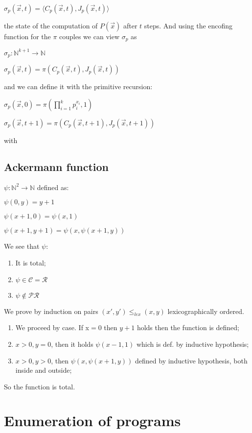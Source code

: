 \documentclass{amsbook}
\newcommand{\nat}{\ensuremath{\mathbb{N}}}
\theoremstyle{definition}
\theoremstyle{remark}
\numberwithin{section}{chapter}
\numberwithin{equation}{chapter}
\begin{document}
\begin{center}
    $\sigma_p(\vec{x},t) = \langle C_p(\vec{x},t), J_p(\vec{x},t) \rangle$
\end{center}

the state of the computation of $P(\vec{x})$ after $t$ steps. And using the encofing function for the $\pi$ couples we can view $\sigma_p$ as

$\sigma_p : \nat^{k+1} \rightarrow \nat$

$\sigma_p(\vec{x}, t) = \pi(C_p(\vec{x},t), J_p(\vec{x},t))$

and we can define it with the primitive recursion:

$\sigma_p(\vec{x}, 0) = \pi(\prod\limits_{i=1}^k p_i^{x_i}, 1)$

$\sigma_p(\vec{x}, t+1) = \pi(C_p(\vec{x},t+1), J_p(\vec{x},t+1))$

with

\section{Ackermann function}
$ \psi: \nat^2 \rightarrow \nat $ defined as:

$ \psi(0,y) = y+1 $

$ \psi(x+1,0) = \psi(x,1) $

$ \psi(x+1,y+1) = \psi(x, \psi(x+1, y)) $

We see that $ \psi $:
\begin{enumerate}
	\item It is total;
	\item $ \psi \in \mathcal{C} = \mathcal{R} $
	\item $ \psi \not \in \mathcal{PR} $
\end{enumerate}

We prove by induction on pairs $ (x',y') \leq_{lex} (x,y) $ lexicographically ordered.

\begin{enumerate}
	\item We proceed by case. If x$ = 0$ then $y + 1$ holds then the function is defined;
	\item $ x>0, y=0 $, then it holds $ \psi(x-1,1) $ which is def. by inductive hypothesis;
	\item $ x>0, y>0 $, then $ \psi(x, \psi(x+1, y)) $ defined by inductive hypothesis, both inside and outside;
\end{enumerate}

So the function is total.

\chapter{Enumeration of programs}
\end{document}
